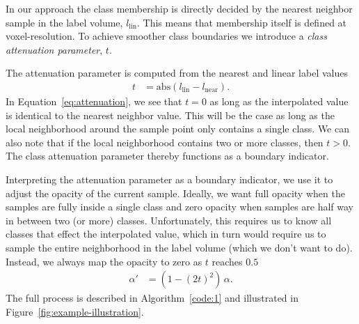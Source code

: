 \documentclass{egpubl}
\begin{document}
In our approach the class membership is directly decided by the nearest neighbor sample in the label volume, $l_\mathrm{lin}$. This means that membership itself is defined at voxel-resolution. To achieve smoother class boundaries we introduce a \emph{class attenuation parameter}, $t$.

The attenuation parameter is computed from the nearest and linear label values
\begin{align}
t &= \mathrm{abs}(l_\mathrm{lin} - l_\mathrm{near})  .  \label{eq:attenuation}
\end{align}
In Equation~\ref{eq:attenuation}, we see that $t=0$ as long as the interpolated value is identical to the nearest neighbor value. This will be the case as long as the local neighborhood around the sample point only contains a single class. We can also note that if the local neighborhood contains two or more classes, then $t > 0$. The class attenuation parameter thereby functions as a boundary indicator.

Interpreting the attenuation parameter as a boundary indicator, we use it to adjust the opacity of the current sample. Ideally, we want full opacity when the samples are fully inside a single class and zero opacity when samples are half way in between two (or more) classes. Unfortunately, this requires us to know all classes that effect the interpolated value, which in turn would require us to sample the entire neighborhood in the label volume (which we don't want to do). Instead, we always map the opacity to zero as $t$ reaches $0.5$ 
\begin{align}
\alpha' &= (1-(2t)^2) \,\alpha  .  \label{eq:alpha}
\end{align}
The full process is described in Algorithm~\ref{code:1} and illustrated in Figure~\ref{fig:example-illustration}.
\end{document}
